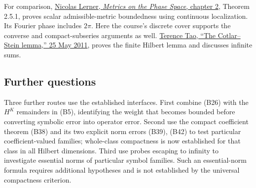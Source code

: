 \documentclass[
  11pt,
]{article}
\begin{document}
For comparison,
\href{https://webusers.imj-prg.fr/~nicolas.lerner/ch2booklerner.pdf}{Nicolas
Lerner, \emph{Metrics on the Phase Space}, chapter 2}, Theorem 2.5.1,
proves scalar admissible-metric boundedness using continuous
localization. Its Fourier phase includes \(2\pi\). Here the course's
discrete cover supports the converse and compact-subseries arguments as
well.
\href{https://terrytao.wordpress.com/2011/05/25/the-cotlar-stein-lemma/}{Terence
Tao, ``The Cotlar--Stein lemma,'' 25 May 2011}, proves the finite
Hilbert lemma and discusses infinite sums.

\subsection{Further questions}\label{further-questions}

Three further routes use the established interfaces. First combine (B26)
with the \(H^K\) remainders in (B5), identifying the weight that becomes
bounded before converting symbolic error into operator error. Second use
the compact coefficient theorem (B38) and its two explicit norm errors
(B39), (B42) to test particular coefficient-valued families; whole-class
compactness is now established for that class in all Hilbert dimensions.
Third use probes escaping to infinity to investigate essential norms of
particular symbol families. Such an essential-norm formula requires
additional hypotheses and is not established by the universal
compactness criterion.
\end{document}
